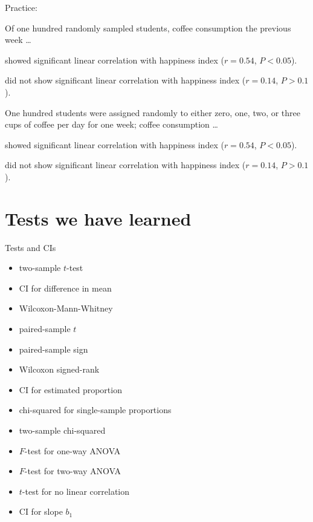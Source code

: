 \begin{frame}{Practice:}

    \vspace{1em}

    Of one hundred randomly sampled students,
    coffee consumption the previous week
    \ldots
    \vspace{1em}

    showed significant linear correlation 
    with happiness index ($r=0.54$, $P<0.05$).
    \vspace{1em}

    \alert{did not} show significant linear correlation 
    with happiness index ($r=0.14$, $P>0.1$).
    \vfill


    One hundred students were assigned randomly
    to either zero, one, two, or three cups of coffee per day
    for one week;
    coffee consumption 
    \ldots
    \vspace{1em}

    showed significant linear correlation 
    with happiness index ($r=0.54$, $P<0.05$).
    \vspace{1em}

    \alert{did not} show significant linear correlation 
    with happiness index ($r=0.14$, $P>0.1$).
    \vfill

\end{frame}


\section{Tests we have learned}

\begin{frame}{Tests and CIs}

  \begin{itemize}
    \item two-sample $t$-test
    \item CI for difference in mean
    \item Wilcoxon-Mann-Whitney
    \item paired-sample $t$
    \item paired-sample sign
    \item Wilcoxon signed-rank
    \item CI for estimated proportion
    \item chi-squared for single-sample proportions
    \item two-sample chi-squared
    \item $F$-test for one-way ANOVA
    \item $F$-test for two-way ANOVA
    \item $t$-test for no linear correlation
    \item CI for slope $b_1$
  \end{itemize}

\end{frame}


